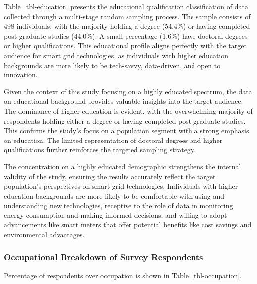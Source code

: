 \documentclass[
  letterpaper,
  DIV=11,
  numbers=noendperiod]{scrartcl}
\begin{document}
Table~\ref{tbl-education} presents the educational qualification
classification of data collected through a multi-stage random sampling
process. The sample consists of 498 individuals, with the majority
holding a degree (54.4\%) or having completed post-graduate studies
(44.0\%). A small percentage (1.6\%) have doctoral degrees or higher
qualifications. This educational profile aligns perfectly with the
target audience for smart grid technologies, as individuals with higher
education backgrounds are more likely to be tech-savvy, data-driven, and
open to innovation.

Given the context of this study focusing on a highly educated spectrum,
the data on educational background provides valuable insights into the
target audience. The dominance of higher education is evident, with the
overwhelming majority of respondents holding either a degree or having
completed post-graduate studies. This confirms the study's focus on a
population segment with a strong emphasis on education. The limited
representation of doctoral degrees and higher qualifications further
reinforces the targeted sampling strategy.

The concentration on a highly educated demographic strengthens the
internal validity of the study, ensuring the results accurately reflect
the target population's perspectives on smart grid technologies.
Individuals with higher education backgrounds are more likely to be
comfortable with using and understanding new technologies, receptive to
the role of data in monitoring energy consumption and making informed
decisions, and willing to adopt advancements like smart meters that
offer potential benefits like cost savings and environmental advantages.

\subsubsection{Occupational Breakdown of Survey
Respondents}\label{occupational-breakdown-of-survey-respondents}

Percentage of respondents over occupation is shown in
Table~\ref{tbl-occupation}.
\end{document}
